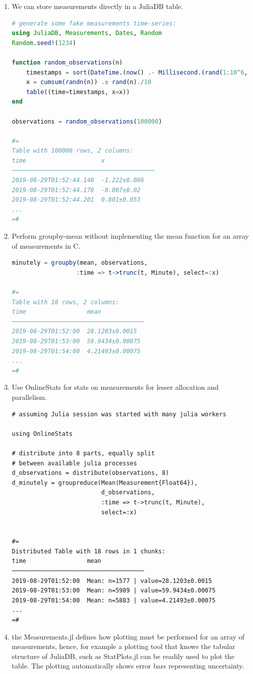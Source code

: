 \documentclass{juliacon}
\begin{document}
\begin{enumerate}
    \item We can store measurements directly in a JuliaDB table.

\begin{lstlisting}[language=Julia]
# generate some fake measurements time-series:
using JuliaDB, Measurements, Dates, Random
Random.seed!(1234)

function random_observations(n)
    timestamps = sort(DateTime.(now() .- Millisecond.(rand(1:10^6, n))))
    x = cumsum(randn(n)) .± rand(n)./10
    table((time=timestamps, x=x))
end

observations = random_observations(100000)

#=
Table with 100000 rows, 2 columns:
time                     x
────────────────────────────────────────
2019-08-29T01:52:44.148  -1.222±0.086
2019-08-29T01:52:44.178  -0.007±0.02
2019-08-29T01:52:44.201  0.801±0.053
...
=#
\end{lstlisting}

\item Perform groupby-mean without implementing the
mean function for an array of measurements in C.

\begin{lstlisting}[language=Julia]
minutely = groupby(mean, observations,
                  :time => t->trunc(t, Minute), select=:x)

#=
Table with 18 rows, 2 columns:
time                 mean
─────────────────────────────────────
2019-08-29T01:52:00  28.1203±0.0015
2019-08-29T01:53:00  59.9434±0.00075
2019-08-29T01:54:00  4.21493±0.00075
...
=#
\end{lstlisting}

\item Use OnlineStats for stats on measurements for lesser allocation and parallelism.

\begin{lstlisting}
# assuming Julia session was started with many julia workers

using OnlineStats

# distribute into 8 parts, equally split
# between available julia processes
d_observations = distribute(observations, 8)
d_minutely = groupreduce(Mean(Measurement{Float64}),
                         d_observations,
                         :time => t->trunc(t, Minute),
                         select=:x)


#=
Distributed Table with 18 rows in 1 chunks:
time                 mean
─────────────────────────────────────
2019-08-29T01:52:00  Mean: n=1577 | value=28.1203±0.0015
2019-08-29T01:53:00  Mean: n=5989 | value=59.9434±0.00075
2019-08-29T01:54:00  Mean: n=5883 | value=4.21493±0.00075
...
=#
\end{lstlisting}

\item the Measurements.jl defines how plotting must be performed for an array of measurements, hence, for example a plotting tool that knows the tabular structure of JuliaDB, such as StatPlots.jl can be readily used to plot the table. The plotting automatically shows error bars representing uncertainty.

\end{enumerate}
\end{document}
